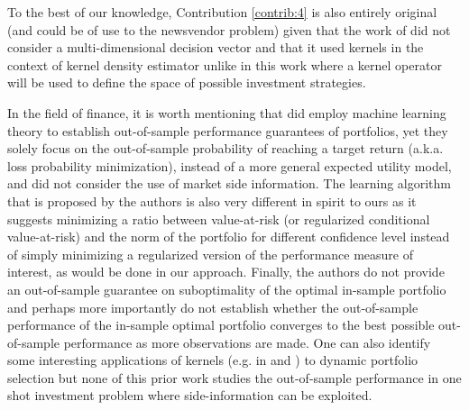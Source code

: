 \documentclass[]{interact}
\theoremstyle{plain}%
\theoremstyle{definition}
\theoremstyle{remark}
\newcommand{\0}{\V{0}}
\newcommand{\1}{\V{1}}
\theoremstyle{plain}
\theoremstyle{definition}
\begin{document}
To the best of our knowledge, Contribution \ref{contrib:4} is also entirely original (and could be of use to the newsvendor problem) given that the work of \cite{rudin2015big} did not consider a multi-dimensional decision vector and that it used kernels in the context of kernel density estimator unlike in this work where a kernel operator will be used to define the space of possible investment strategies. 

In the field of finance, it is worth mentioning that \cite{GOTOH2012371} did employ machine learning theory to establish out-of-sample performance guarantees of portfolios, yet they solely focus on the out-of-sample probability of reaching a target return (a.k.a. loss probability minimization), instead of a more general expected utility model, and did not consider the use of market side information. The learning algorithm that is proposed by the authors is also very different in spirit to ours as it suggests minimizing a ratio between value-at-risk (or regularized conditional value-at-risk) and the norm of the portfolio for different confidence level instead of simply minimizing a regularized version of the performance measure of interest, as would be done in our approach. Finally, the authors do not provide an out-of-sample guarantee on suboptimality of the optimal in-sample portfolio and perhaps more importantly do not  establish whether the out-of-sample performance of the in-sample optimal portfolio converges to the best possible out-of-sample performance as more observations are made. One can also identify some interesting applications of kernels (e.g. in \cite{Gyorfi06nonparametrickernel-based} and \cite{TAKANO20143901}) to dynamic portfolio selection but none of this prior work studies the out-of-sample performance in one shot investment problem where side-information can be exploited. 
\end{document}
